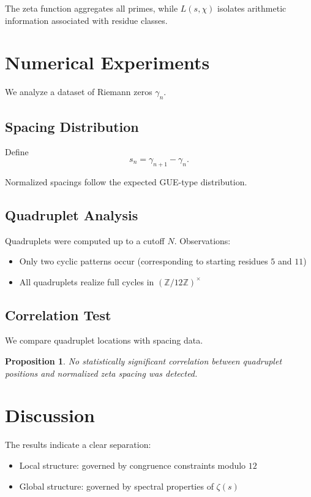 \documentclass[11pt]{article}
\newtheorem{proposition}{Proposition}
\begin{document}
The zeta function aggregates all primes, while $L(s,\chi)$ isolates 
arithmetic information associated with residue classes.

\section{Numerical Experiments}

We analyze a dataset of Riemann zeros $\gamma_n$.

\subsection{Spacing Distribution}

Define
\[
s_n = \gamma_{n+1} - \gamma_n.
\]

Normalized spacings follow the expected GUE-type distribution.

\subsection{Quadruplet Analysis}

Quadruplets were computed up to a cutoff $N$. Observations:

\begin{itemize}
\item Only two cyclic patterns occur (corresponding to starting residues $5$ and $11$)
\item All quadruplets realize full cycles in $(\mathbb{Z}/12\mathbb{Z})^\times$
\end{itemize}

\subsection{Correlation Test}

We compare quadruplet locations with spacing data.

\begin{proposition}
No statistically significant correlation between quadruplet positions 
and normalized zeta spacing was detected.
\end{proposition}

\section{Discussion}

The results indicate a clear separation:

\begin{itemize}
\item Local structure: governed by congruence constraints modulo $12$
\item Global structure: governed by spectral properties of $\zeta(s)$
\end{itemize}
\end{document}
